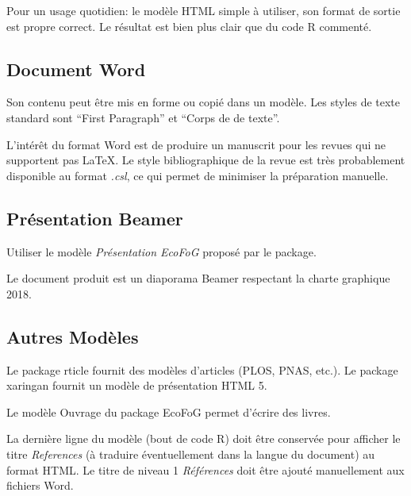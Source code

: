 \documentclass[fleqn,10pt]{ArtEcoFoG} %
\begin{document}
Pour un usage quotidien: le modèle HTML simple à utiliser, son format de
sortie est propre correct. Le résultat est bien plus clair que du code R
commenté.

\subsection{Document Word}\label{document-word}

Son contenu peut être mis en forme ou copié dans un modèle. Les styles
de texte standard sont ``First Paragraph'' et ``Corps de de texte''.

L'intérêt du format Word est de produire un manuscrit pour les revues
qui ne supportent pas \LaTeX. Le style bibliographique de la revue est
très probablement disponible au format \emph{.csl}, ce qui permet de
minimiser la préparation manuelle.

\subsection{Présentation Beamer}\label{presentation-beamer}

Utiliser le modèle \emph{Présentation EcoFoG} proposé par le package.

Le document produit est un diaporama Beamer respectant la charte
graphique 2018.

\subsection{Autres Modèles}\label{autres-modeles}

Le package rticle fournit des modèles d'articles (PLOS, PNAS, etc.). Le
package xaringan fournit un modèle de présentation HTML 5.

Le modèle Ouvrage du package EcoFoG permet d'écrire des livres.

La dernière ligne du modèle (bout de code R) doit être conservée pour
afficher le titre \emph{References} (à traduire éventuellement dans la
langue du document) au format HTML. Le titre de niveau 1
\emph{Références} doit être ajouté manuellement aux fichiers Word.





\end{document}
